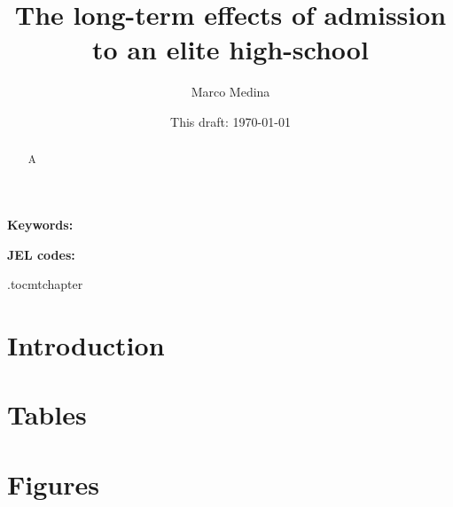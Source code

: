 \documentclass[oneside,11pt]{article}
\begin{document}
\title{The long-term effects of admission to an elite high-school}
\author{Marco Medina}
\date{This draft:  \today \\[2 cm]}



\maketitle
\thispagestyle{empty}
\begin{abstract}
A
\end{abstract}

\vspace{.3in}

\textbf{Keywords: }

\textbf{JEL codes:}

\newpage

\etocdepthtag.toc{mtchapter}



\section{Introduction}


\newpage



\clearpage

%
%



\clearpage
\singlespacing

\section{Tables}



\clearpage

\section{Figures}



\clearpage

\end{document}
